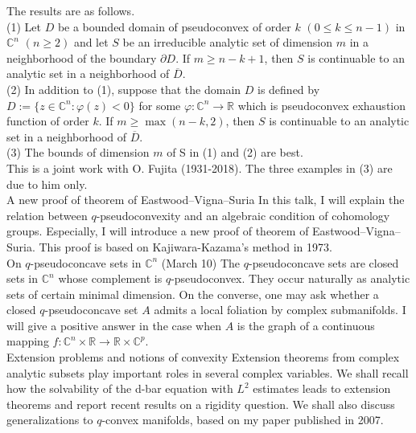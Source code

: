 \documentclass[a4]{article}
\theoremstyle{plain} %
\theoremstyle{definition} %
\begin{document}
The results are as follows. \\
(1) Let $D$ be a bounded domain of pseudoconvex of order $k$ $(0 \leq k \leq n-1)$ in $\mathbb{C}^n$ $(n \geq 2)$ and let $S$ be an irreducible analytic set of dimension
$m$ in a neighborhood of the boundary $\partial D$. If $m \geq n - k + 1$, then $S$ is
continuable to an analytic set in a neighborhood of $\overline{D}$.\\
(2) In addition to (1), suppose that the domain $D$ is defined by $D :=
\{ z\in \mathbb{C}^n : \varphi(z) < 0\}$ for some $\varphi\colon \mathbb{C}^n \to \mathbb{R}$ which is pseudoconvex exhaustion function of order $k$. 
If $m \geq \max (n-k, 2)$, then $S$ is continuable to an analytic set in a neighborhood of $\overline{D}$. \\
(3) The bounds of dimension $m$ of S in (1) and (2) are best.\\
This is a joint work with O. Fujita (1931-2018). 
\noindent The three examples in (3) are due to him only.
\vskip5mm
\\
A new proof of  theorem of Eastwood--Vigna--Suria
\vskip3mm
In this talk, I will explain the relation between $q$-pseudoconvexity and an algebraic condition of cohomology groups. Especially, I will introduce a new proof of theorem of Eastwood--Vigna--Suria. This proof is based on Kajiwara-Kazama's method in 1973.
\vskip5mm
\\
On $q$-pseudoconcave sets in $\mathbb{C}^n$  (March 10)
\vskip3mm
The $q$-pseudoconcave sets are closed sets in $\mathbb{C}^n$ whose complement is $q$-pseudoconvex. They occur naturally as analytic sets of certain minimal dimension. On the converse, one may ask whether a closed $q$-pseudoconcave set $A$ admits a local foliation by complex submanifolds. I will give a positive answer in the case when $A$ is the graph of a continuous mapping $f\colon \mathbb{C}^n\times\mathbb{R}\to\mathbb{R}\times \mathbb{C}^p$. 
\vskip5mm
\\
Extension problems and notions of convexity
\vskip3mm
Extension theorems from complex analytic subsets play important roles in several complex variables. We shall recall how the solvability of the d-bar equation with $L^2$ estimates leads to extension theorems and report recent results on a rigidity question. We shall also discuss generalizations to $q$-convex manifolds, based on my paper published in 2007.
\end{document}

